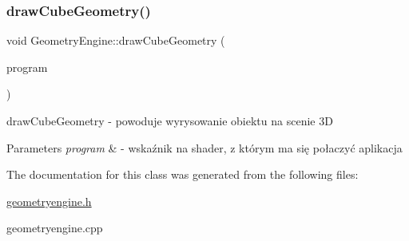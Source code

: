 \subsubsection{\texorpdfstring{draw\+Cube\+Geometry()}{drawCubeGeometry()}}
{\footnotesize\ttfamily void Geometry\+Engine\+::draw\+Cube\+Geometry (\begin{DoxyParamCaption}\item[{Q\+Open\+G\+L\+Shader\+Program $\ast$}]{program }\end{DoxyParamCaption})}



draw\+Cube\+Geometry -\/ powoduje wyrysowanie obiektu na scenie 3D 


\begin{DoxyParams}{Parameters}
{\em program} & -\/ wskaźnik na shader, z którym ma się połaczyć aplikacja \\
\hline
\end{DoxyParams}


The documentation for this class was generated from the following files\+:\begin{DoxyCompactItemize}
\item 
\hyperlink{geometryengine_8h}{geometryengine.\+h}\item 
geometryengine.\+cpp\end{DoxyCompactItemize}
